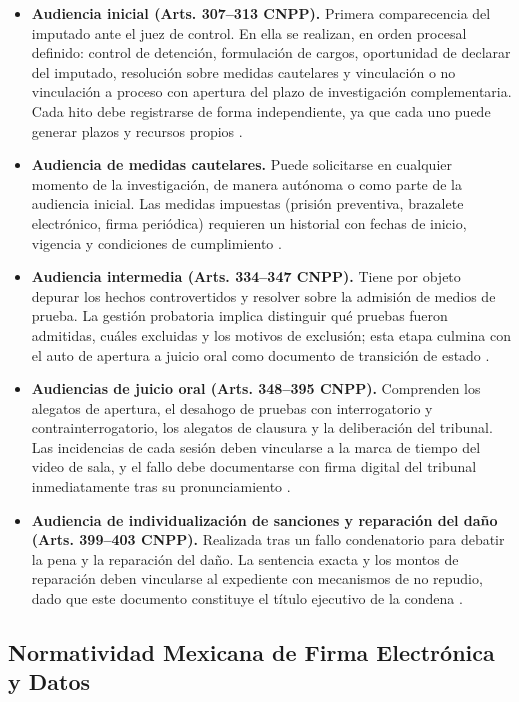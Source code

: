 \begin{itemize}
  \item \textbf{Audiencia inicial (Arts. 307--313 CNPP).} Primera comparecencia del imputado ante el juez de control. En ella se realizan, en orden procesal definido: control de detención, formulación de cargos, oportunidad de declarar del imputado, resolución sobre medidas cautelares y vinculación o no vinculación a proceso con apertura del plazo de investigación complementaria. Cada hito debe registrarse de forma independiente, ya que cada uno puede generar plazos y recursos propios \cite{cnpp2021}.

  \item \textbf{Audiencia de medidas cautelares.} Puede solicitarse en cualquier momento de la investigación, de manera autónoma o como parte de la audiencia inicial. Las medidas impuestas (prisión preventiva, brazalete electrónico, firma periódica) requieren un historial con fechas de inicio, vigencia y condiciones de cumplimiento \cite{cnpp2021}.

  \item \textbf{Audiencia intermedia (Arts. 334--347 CNPP).} Tiene por objeto depurar los hechos controvertidos y resolver sobre la admisión de medios de prueba. La gestión probatoria implica distinguir qué pruebas fueron admitidas, cuáles excluidas y los motivos de exclusión; esta etapa culmina con el auto de apertura a juicio oral como documento de transición de estado \cite{cnpp2021}.

  \item \textbf{Audiencias de juicio oral (Arts. 348--395 CNPP).} Comprenden los alegatos de apertura, el desahogo de pruebas con interrogatorio y contrainterrogatorio, los alegatos de clausura y la deliberación del tribunal. Las incidencias de cada sesión deben vincularse a la marca de tiempo del video de sala, y el fallo debe documentarse con firma digital del tribunal inmediatamente tras su pronunciamiento \cite{cnpp2021}.

  \item \textbf{Audiencia de individualización de sanciones y reparación del daño (Arts. 399--403 CNPP).} Realizada tras un fallo condenatorio para debatir la pena y la reparación del daño. La sentencia exacta y los montos de reparación deben vincularse al expediente con mecanismos de no repudio, dado que este documento constituye el título ejecutivo de la condena \cite{cnpp2021}.
\end{itemize}

\subsection{Normatividad Mexicana de Firma Electrónica y Datos}\label{sec:normatividad-firma}

